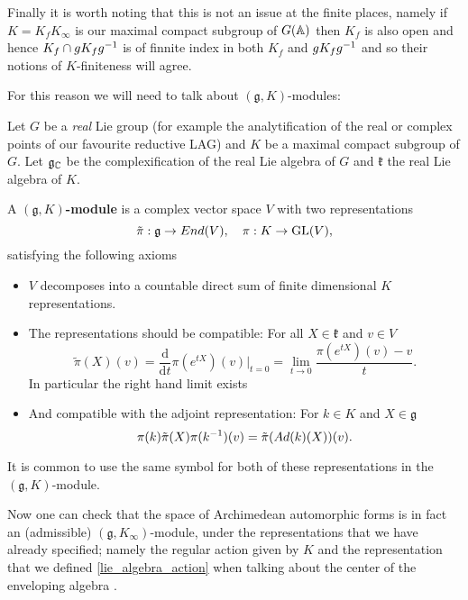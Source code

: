 \begin{example}
    Finally it is worth noting that this is not an issue at the finite places, namely if \(K = K_fK_\infty\) is our maximal compact subgroup of \(G(\A)\) then \(K_f\) is also open and hence \(K_f \cap gK_f g^{-1}\) is of finnite index in both \(K_f\) and \(gK_f g^{-1}\) and so their notions of \(K\)-finiteness will agree. 
\end{example}

For this reason we will need to talk about \((\mathfrak{g}, K)\)-modules:

\begin{definition}
    Let \(G\) be a \textit{real} Lie group (for example the analytification of the real or complex points of our favourite reductive LAG) and \(K\) be a maximal compact subgroup of \(G\). Let \(\mathfrak{g}_\C\) be the complexification of the real Lie algebra of \(G\) and \(\mathfrak{k}\) the real Lie algebra of \(K\). 
    
    A \textbf{\((\mathfrak{g}, K)\)-module} is a complex vector space \(V\) with two representations 
    \[\tilde{\pi}: \mathfrak{g} \to End(V), \quad \pi: K\to \operatorname{GL}(V),\]
    satisfying the following axioms
    \begin{itemize}
        \item \(V\) decomposes into a countable direct sum of finite dimensional \(K\) representations.
        \item The representations should be compatible: For all \(X \in \mathfrak{k}\) and \(v\in V\)
        \[\tilde{\pi}(X)(v) = \frac{\mathrm{d}}{\mathrm{d}t}\pi(e^{tX})(v)|_{t=0} = \lim_{t\to 0}\frac{\pi(e^{tX})(v) - v}{t}.\]
        In particular the right hand limit exists
        \item And compatible with the adjoint representation: For \(k\in K\) and \(X\in \mathfrak{g}\) 
         \[\pi(k)\tilde{\pi}(X) \pi(k^{-1} )(v) = \tilde{\pi}(Ad(k)(X))(v).\]
    \end{itemize}
\end{definition}

\begin{remark}
    It is common to use the same symbol for both of these representations in the \((\mathfrak{g}, K)\)-module.
\end{remark}



Now one can check that the space of Archimedean automorphic forms is in fact an (admissible) \((\mathfrak{g}, K_\infty)\)-module, under the representations that we have already specified; namely the regular action given by \(K\) and the representation that we defined \ref{lie_algebra_action} when talking about the center of the enveloping algebra \cite[Thm. 6.2.6]{getzIntroductionAutomorphicRepresentations2024}.

